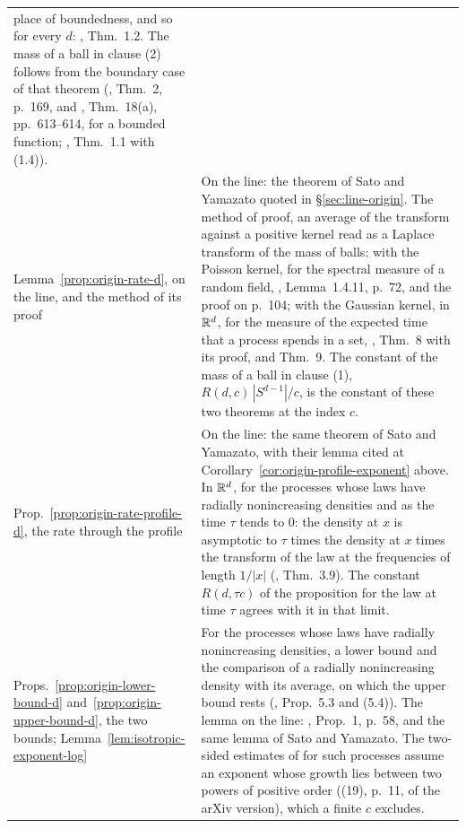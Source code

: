 {\begin{longtable}{@{}S{0.2\textwidth}S{0.76\textwidth}@{}}
  place of boundedness, and so for every $d$: , Thm.~1.2. The mass of
  a ball in clause (2) follows from the boundary case of that theorem
  (, Thm.~2, p.~169, and , Thm.~18(a),
  pp.~613--614, for a bounded function; , Thm.~1.1 with (1.4)). \\
\addlinespace
Lemma~\ref{prop:origin-rate-d}, on the line, and the method of its proof &
  On the line: the theorem of Sato and Yamazato quoted in \S\ref{sec:line-origin}. The method
  of proof, an average of the transform against a positive kernel read as a Laplace transform of
  the mass of balls: with the Poisson kernel, for the spectral measure of a random field,
  , Lemma~1.4.11, p.~72, and the proof on p.~104; with the Gaussian
  kernel, in $\mathbb{R}^d$, for the measure of the expected time that a \Levy{} process spends in a
  set, , Thm.~8 with its proof, and Thm.~9. The constant of the
  mass of a ball in clause (1), $R(d,c)\,|S^{d-1}|/c$, is the constant of these two theorems at
  the index $c$. \\
\addlinespace
Prop.~\ref{prop:origin-rate-profile-d}, the rate through the profile &
  On the line: the same theorem of Sato and Yamazato, with their lemma cited at
  Corollary~\ref{cor:origin-profile-exponent} above. In $\mathbb{R}^d$, for the \Levy{} processes whose
  laws have radially nonincreasing densities and as the time $\tau$ tends to $0$: the density at
  $x$ is asymptotic to $\tau$ times the \Levy{} density at $x$ times the transform of the law at
  the frequencies of length $1/|x|$ (, Thm.~3.9). The constant
  $R(d,\tau c)$ of the proposition for the law at time $\tau$ agrees with it in that limit. \\
\addlinespace
Props.~\ref{prop:origin-lower-bound-d} and~\ref{prop:origin-upper-bound-d}, the two bounds;
Lemma~\ref{lem:isotropic-exponent-log} &
  For the \Levy{} processes whose laws have radially nonincreasing densities, a lower bound and the
  comparison of a radially nonincreasing density with its average, on which the upper bound rests
  (, Prop.~5.3 and (5.4)). The lemma on the line:
  , Prop.~1, p.~58, and the same lemma of Sato and Yamazato. The
  two-sided estimates of  for such processes assume an exponent whose
  growth lies between two powers of positive order ((19), p.~11, of the arXiv version), which a
  finite $c$ excludes. \\

\end{longtable}}
